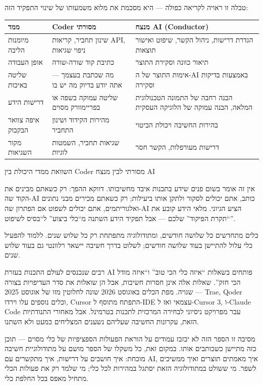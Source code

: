 טבלה זו ראויה לקריאה כפולה — היא מסכמת את מלוא משמעותו של שינוי התפקיד הזה:

\begin{center}
\begin{tabularx}{\linewidth}{|X|X|X|}
\hline
\textbf{ממד} & \textbf{Coder מסורתי} & \textbf{מנצח AI (Conductor)} \tabularnewline
\hline
מיומנות הליבה & שינון תחביר, קריאות API, ניפוי שגיאות & הגדרת דרישות, ניהול הקשר, שיפוט ואישור תוצאות \tabularnewline
אופן העבודה & כתיבת קוד שורה-שורה & תיאור כוונה וסקירת התוצר \tabularnewline
שליטה באיכות & מה שכתבת בעצמך — אתה יודע בדיוק מה יש בו & אימות התוצר של ה-AI באמצעות בדיקות וסקירה \tabularnewline
דרישות הידע & שליטה עמוקה בשפה או בפריימוורק מסוים & הבנה רחבה של התמונה הטכנולוגית המלאה, הבנה עמוקה של הלוגיקה העסקית \tabularnewline
איפה צוואר הבקבוק & מהירות הקידוד ושינון התחביר & בהירות החשיבה ויכולת הביטוי \tabularnewline
מקור השגיאות & שגיאות תחביר, השמטות לוגיות & דרישות מעורפלות, הקשר חסר \tabularnewline
\hline
\end{tabularx}
\end{center}

\begin{center}\small\color{gray}השוואת ממדי היכולת בין Coder מסורתי לבין מנצח AI\end{center}

אין זה אומר בשום פנים שידע בתכנות איבד מחשיבותו. דווקא ההפך: רק כשאתם מבינים את הקוד שה-AI כותב, אתם יכולים לסקור ולתקן אותו ביעילות; רק כשאתם מכירים מבני נתונים ואלגוריתמים, אתם יכולים לשפוט אם הפתרון שה-AI הציע הגיוני. מלאי הידע קובע את “תקרת הפיקוד” שלכם — אבל תפקיד הידע השתנה מ“כלי ביצוע” ל“בסיס לשיפוט”.


כלים מתחדשים כל שלושה חודשים, ומתודולוגיה מתפתחת רק כל שלוש שנים. ללמוד להפעיל כלי עלול להתיישן בעוד שלושה חודשים; לשלוט בדרך חשיבה יישאר רלוונטי גם בעוד שלוש שנים.

רבים שנכנסים לעולם התכנות בעזרת AI פותחים בשאלות “איזה כלי הכי טוב” ו“איזה מודל הכי חזק”. שאלות אלה אינן חסרות חשיבות, אבל הן שואלות את סדר העדיפויות בצורה שגויה. מפת הכלים באוגוסט 2026 שונה לחלוטין מזו של אוגוסט 2025 — Trae, Qoder וכלים נוספים עלו וירדו, Cursor התפתח מתוסף ל-IDE עצמאי ואז ל-Cursor 3, ו-Claude Code עבר מפרויקט ניסיוני לבחירה המרכזית לתכנות בטרמינל. אבל מאחורי התנודתיות הזאת, עקרונות החשיבה שעליהם נשענים המצליחים כמעט ולא השתנו.

מסיבה זו הספר הזה לא יבזבז עמודים על הוראת הפעולות הספציפיות של כלי מסוים — תוכן כזה מתיישן כשכותבים אותו. במקום זאת, כל משקלו של הספר מושם על מתודולוגיית חשיבה מוכחת: איך חושבים על דרישות, איך מתקשרים עם AI, איך מאמתים תוצרים ואיך ממשיכים לשפר. מי ששולט במתודולוגיה הזאת יסתגל במהירות לכל כלי; מי שלמד רק את פעולות הכלי מתחיל מאפס בכל החלפת כלי.

